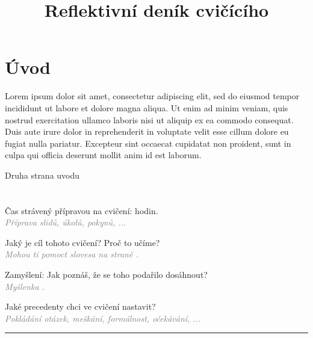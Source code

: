 \documentclass[twoside,openany,10pt]{book}
\title{Reflektivní deník cvičícího}
\author{}
\date{}
\newcommand{\note}[1]{\textcolor{gray}{\small\itshape #1}}
\newcommand{\marginsection}[3]{\marginpar{\raisebox{#2\height}{
\begin{turn}{#1}
\bfseries \color{gray} \large
#3\end{turn}}}}
\newlength{\rulelength}
\begin{document}
\maketitle


\chapter*{Úvod}

Lorem ipsum dolor sit amet, consectetur adipiscing elit, sed do eiusmod tempor incididunt ut labore et dolore magna aliqua. Ut enim ad minim veniam, quis nostrud exercitation ullamco laboris nisi ut aliquip ex ea commodo consequat. Duis aute irure dolor in reprehenderit in voluptate velit esse cillum dolore eu fugiat nulla pariatur. Excepteur sint occaecat cupidatat non proident, sunt in culpa qui officia deserunt mollit anim id est laborum.

\newpage
Druha strana uvodu



\chapter{}
\vspace*{-2em}

\marginsection{90}{-2.1}{před cvičením}

Čas strávený přípravou na cvičení: \hspace{1cm} hodin.\\
\note{Příprava slidů, úkolů, pokynů, ...}

Jaký je cíl tohoto cvičení? Proč to učíme? \\
\note{Mohou ti pomoct slovesa na straně \pageref{bloom}.}
\vspace*{1cm}

Zamyšlení: Jak poznáš, že se toho podařilo dosáhnout? \\
\note{Myšlenka .}

Jaké precedenty chci ve cvičení nastavit? \\
\note{Pokládání otázek, meškání, formálnost, očekávání, ...}
\vspace*{1cm}

\hspace*{-1cm}
\rule{}{0.4pt}
\end{document}
